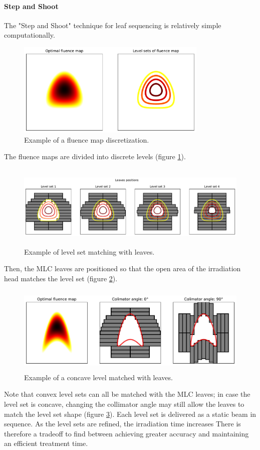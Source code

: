 \paragraph[S\&S]{Step and Shoot}
The "Step and Shoot" technique for leaf sequencing is relatively simple computationally.
\begin{figure}
	\centering
	\includegraphics[height=4.5cm]{_fluence_map_discretization.pdf}
	\caption{Example of a fluence map discretization.}
	\label{fig:fluence_map_discretization}
\end{figure}
The fluence maps are divided into discrete levels (figure \ref{fig:fluence_map_discretization}).
\begin{figure}
	\centering
	\includegraphics[height=4cm]{_level_set_matching_with_leaves.pdf}
	\caption{Example of level set matching with leaves.}
	\label{fig:level_set_matching_with_leaves}
\end{figure}
Then, the MLC leaves are positioned so that the open area of the irradiation head matches the level set (figure \ref{fig:level_set_matching_with_leaves}).
\begin{figure}
	\centering
	\includegraphics[height=4.2cm]{_leaves_angle.pdf}
	\caption{Example of a concave level matched with leaves.}
	\label{fig:leaves_angle}
\end{figure}
Note that convex level sets can all be matched with the MLC leaves; in case the level set is concave, changing the collimator angle may still allow the leaves to match the level set shape (figure \ref{fig:leaves_angle}).
Each level set is delivered as a static beam in sequence.
As the level sets are refined, the irradiation time increases
There is therefore a tradeoff to find between achieving greater accuracy and maintaining an efficient treatment time.

